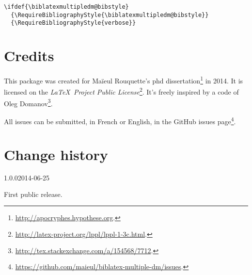 \documentclass{ltxdockit}[2011/03/25]
\begin{document}
\begin{verbatim}
\ifdef{\biblatexmultipledm@bibstyle}
  {\RequireBibliographyStyle{\biblatexmultipledm@bibstyle}}
  {\RequireBibliographyStyle{verbose}}
\end{verbatim} 

\section{Credits}

This package was created for Maïeul Rouquette's phd dissertation\footnote{\url{http://apocryphes.hypothese.org}.} in 2014. It is licensed on the \emph{\LaTeX\ Project Public License}\footnote{\url{http://latex-project.org/lppl/lppl-1-3c.html}.}. It's freely inspired by a code of Oleg Domanov\footnote{\url{http://tex.stackexchange.com/a/154568/7712}.}.


All issues can be submitted, in French or English, in the GitHub issues page\footnote{\url{https://github.com/maieul/biblatex-multiple-dm/issues}.}.

\section{Change history}

\begin{changelog}



\begin{release}{1.0.0}{2014-06-25}
\item First public release.
\end{release}
\end{changelog}
\end{document}
